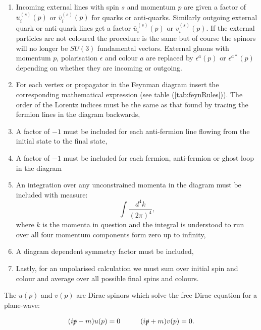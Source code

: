 	\begin{enumerate}
		\item Incoming external lines with spin $s$ and momentum $p$ are given a factor of $u^{(s)}_i(p)$ or
		      $\overline{v}^{(s)}_i(p)$ for quarks or anti-quarks.  Similarly outgoing external quark or
		      anti-quark lines get a factor $\overline{u}^{(s)}_i(p)$ or $v^{(s)}_i(p)$.  If the external particles
		      are not coloured the procedure is the same but of course the spinors will no longer be $SU(3)$
		      fundamental vectors.  External gluons with momentum $p$, polarisation $\epsilon$ and colour $a$ are
		      replaced by $\epsilon^a(p)$ or $\epsilon^{a*}(p)$ depending on whether they are incoming or outgoing.
		\item For each vertex or propagator in the Feynman diagram insert the corresponding mathematical
		      expression (see table (\ref{tab:feynRules})).  The order of the Lorentz indices must be the same
		      as that found by tracing the fermion lines in the diagram backwards,
		\item A factor of $-1$ must be included for each anti-fermion line flowing from the initial state
		      to the final state,
		\item A factor of $-1$ must be included for each fermion, anti-fermion or ghost loop in the diagram
		\item An integration over any unconstrained momenta in the diagram must be included with measure:
		      \begin{equation}
		      	\int\frac{d^4k}{(2\pi)^4},
		      \end{equation}
		      where $k$ is the momenta in question and the integral is understood to run over all four momentum
		      components form zero up to infinity,
		\item A diagram dependent symmetry factor must be included,
		\item Lastly, for an unpolarised calculation we must sum over initial spin and colour and average
		      over all possible final spins and colours.
	\end{enumerate}

	The $u(p)$ and $v(p)$ are Dirac spinors which solve the free Dirac equation for a plane-wave:

	\begin{equation}
		(i\slashed p - m)u(p)=0\hspace{1cm}(i\slashed p + m)v(p)=0.
		\label{eqn:diracPW}
	\end{equation}


